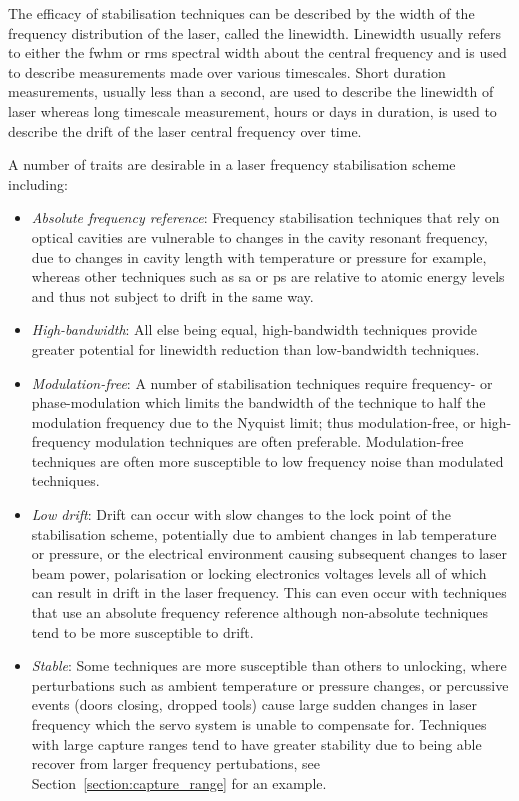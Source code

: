 The efficacy of stabilisation techniques can be described by the width of the frequency distribution of the laser, called the linewidth.
Linewidth usually refers to either the \gls{fwhm} or \gls{rms} spectral width about the central frequency and is used to describe measurements made over various timescales.
Short duration measurements, usually less than a second, are used to describe the linewidth of laser whereas long timescale measurement, hours or days in duration, is used to describe the drift of the laser central frequency over time.

A number of traits are desirable in a laser frequency stabilisation scheme including:
\begin{itemize}
    \item \emph{Absolute frequency reference}: Frequency stabilisation techniques that rely on optical cavities are vulnerable to changes in the cavity resonant frequency, due to changes in cavity length with temperature or pressure for example, whereas other techniques such as \gls{sa} or \gls{ps} are relative to atomic energy levels and thus not subject to drift in the same way.
    \item \emph{High-bandwidth}: All else being equal, high-bandwidth techniques provide greater potential for linewidth reduction than low-bandwidth techniques.
    \item \emph{Modulation-free}: A number of stabilisation techniques require frequency- or phase-modulation which limits the bandwidth of the technique to half the modulation frequency due to the Nyquist limit; thus modulation-free, or high-frequency modulation techniques are often preferable. Modulation-free techniques are often more susceptible to low frequency noise than modulated techniques.
    \item \emph{Low drift}: Drift can occur with slow changes to the lock point of the stabilisation scheme, potentially due to ambient changes in lab temperature or pressure, or the electrical environment causing subsequent changes to laser beam power, polarisation or locking electronics voltages levels all of which can result in drift in the laser frequency. This can even occur with techniques that use an absolute frequency reference although non-absolute techniques tend to be more susceptible to drift.
    \item \emph{Stable}: Some techniques are more susceptible than others to unlocking, where perturbations such as ambient temperature or pressure changes, or percussive events (doors closing, dropped tools) cause large sudden changes in laser frequency which the servo system is unable to compensate for. Techniques with large capture ranges tend to have greater stability due to being able recover from larger frequency pertubations, see Section~\ref{section:capture_range} for an example.
\end{itemize}

